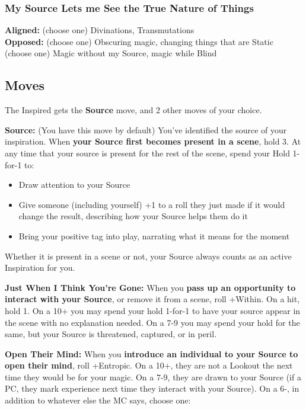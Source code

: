 \documentclass[
  oneside,
  statementpaper,
  9pt]{memoir}
\begin{document}
\hypertarget{my-source-lets-me-see-the-true-nature-of-things}{%
\subsubsection{My Source Lets me See the True Nature of
Things}\label{my-source-lets-me-see-the-true-nature-of-things}}

\textbf{Aligned:} (choose one) Divinations, Transmutations\\
\textbf{Opposed:} (choose one) Obscuring magic, changing things that are
Static\\
(choose one) Magic without my Source, magic while Blind

\hypertarget{moves-2}{%
\subsection{Moves}\label{moves-2}}

The Inspired gets the \textbf{Source} move, and 2 other moves of your
choice.

\textbf{Source:} (You have this move by default) You've identified the
source of your inspiration. When \textbf{your Source first becomes
present in a scene}, hold 3. At any time that your source is present for
the rest of the scene, spend your Hold 1-for-1 to:

\begin{itemize}
\tightlist
\item
  Draw attention to your Source
\item
  Give someone (including yourself) +1 to a roll they just made if it
  would change the result, describing how your Source helps them do it
\item
  Bring your positive tag into play, narrating what it means for the
  moment
\end{itemize}

Whether it is present in a scene or not, your Source always counts as an
active Inspiration for you.

\textbf{Just When I Think You're Gone:} When you \textbf{pass up an
opportunity to interact with your Source}, or remove it from a scene,
roll +Within. On a hit, hold 1. On a 10+ you may spend your hold 1-for-1
to have your source appear in the scene with no explanation needed. On a
7-9 you may spend your hold for the same, but your Source is threatened,
captured, or in peril.

\textbf{Open Their Mind:} When you \textbf{introduce an individual to
your Source to open their mind}, roll +Entropic. On a 10+, they are not
a Lookout the next time they would be for your magic. On a 7-9, they are
drawn to your Source (if a PC, they mark experience next time they
interact with your Source). On a 6-, in addition to whatever else the MC
says, choose one:
\end{document}
